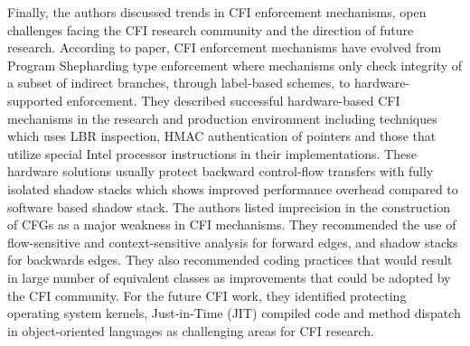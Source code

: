 \documentclass[dvips,12pt]{article}
\begin{document}
\newline
\newline
Finally, the authors discussed trends in CFI enforcement mechanisms, open challenges facing the CFI research community and the direction of future research. According to paper, CFI enforcement mechanisms have evolved from Program Shepharding type enforcement where mechanisms only check integrity of a subset of indirect branches, through label-based schemes, to hardware-supported enforcement. They described successful hardware-based CFI mechanisms in the research and production environment including techniques which uses LBR inspection, HMAC authentication of pointers and those that utilize special Intel processor instructions in their implementations. These hardware solutions usually protect backward control-flow transfers with fully isolated shadow stacks which shows improved performance overhead compared to software based shadow stack. The authors listed imprecision in the construction of CFGs as a major weakness in CFI mechanisms. They recommended the use of flow-sensitive and context-sensitive analysis for forward edges, and shadow stacks for backwards edges. They also recommended coding practices that would result in large number of equivalent classes as improvements that could be adopted by the CFI community. For the future CFI work, they identified protecting operating system kernels, Just-in-Time (JIT) compiled code and method dispatch in object-oriented languages as challenging areas for CFI research.










 





\end{document}
